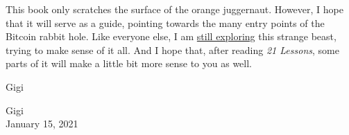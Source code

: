 This book only scratches the surface of the orange juggernaut. However, I hope
that it will serve as a guide, pointing towards the many entry points of the
Bitcoin rabbit hole. Like everyone else, I am
\href{https://twitter.com/dergigi/status/1285485658656649216?s=20}{still
exploring} this strange beast, trying to make sense of it all. And I hope that,
after reading \textit{21 Lessons}, some parts of it will make a little bit more
sense to you as well.

Gigi

\begin{flushright}
  Gigi \\
  January 15, 2021
\end{flushright}

